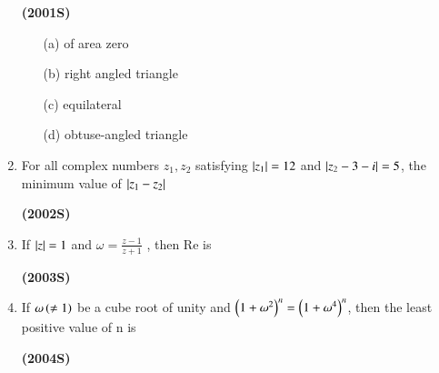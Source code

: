 \documentclass[journal,12pt,twocolumn]{IEEEtran}
\theoremstyle{remark}
\begin{document}
\begin{enumerate}[start=6]
\hfill{\textbf{(2001S)}}

\begin{enumerate}
\item[(a)]of area zero
\item[(b)]right angled triangle
\item[(c)]equilateral
\item[(d)]obtuse-angled triangle
\end{enumerate}
\item For all complex numbers $z_1,z_2$ satisfying $\left\vert z_1\right\vert=12$ and $\left\vert z_2-3-i\right\vert=5$, the minimum value of $\left\vert z_1-z_2\right\vert$

\hfill{\textbf{(2002S)}}

\begin{enumerate}
\end{enumerate}
\item If $\left\vert z\right\vert=1$ and $\omega=\frac{z-1}{z+1}$ , then Re\brak{\omega} is

\hfill{\textbf{(2003S)}}

\begin{enumerate}
\end{enumerate}
\item If $\omega\left(\neq1\right)$ be a cube root of unity and $\left(1+\omega^2\right)^n = \left(1+\omega^4\right)^n$, then the least positive value of n is

\hfill{\textbf{(2004S)}}

\begin{enumerate}
\end{enumerate}
\end{enumerate}
\end{document}
